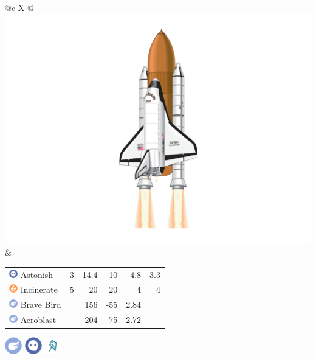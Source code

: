 \documentclass[ebook,10pt,openany,oneside]{memoir}
\begin{document}
\begin{speciesbox}[title=OV-099 Challenger,title style={left color=Flying,right color=Ghost},after title={\hfill 200 120 100 140.00 133.89}]
\footnotesize
\begin{tabularx}{\linewidth}{@{}c X @{}}
\includegraphics[width=0.3\linewidth,valign=c,keepaspectratio]{images/challenger.png} &
\begingroup
\setlength{\tabcolsep}{4pt}
\begin{tabular}{lrrrrr}
\includegraphics[height=1em,keepaspectratio]{images/ghost.png} Astonish & 3 & 14.4 & 10 & 4.8 & 3.3 \\
\includegraphics[height=1em,keepaspectratio]{images/fire.png} Incinerate & 5 & 20 & 20 & 4 & 4 \\
\includegraphics[height=1em,keepaspectratio]{images/flying.png} Brave Bird & & 156 & -55 & 2.84 & \\
\includegraphics[height=1em,keepaspectratio]{images/flying.png} Aeroblast & & 204 & -75 & 2.72 & \\
\end{tabular}
\endgroup
\end{tabularx}
\noindent\begin{minipage}{0.3\linewidth}
\includegraphics[height=2em,keepaspectratio]{images/flying.png}
\includegraphics[height=2em,keepaspectratio]{images/ghost.png}
\includegraphics[height=2em,keepaspectratio]{images/windy.png}

\end{minipage}
\end{speciesbox}
\end{document}
